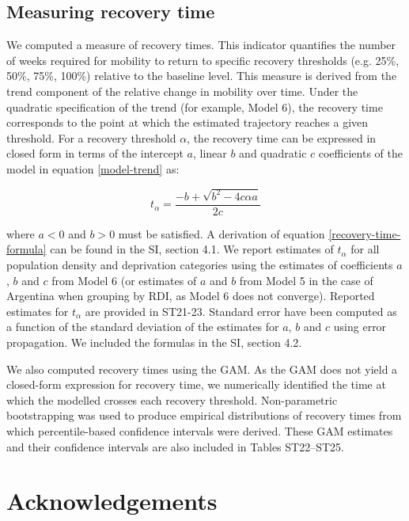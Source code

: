 \documentclass[fleqn,10pt]{wlscirep}
\begin{document}
\subsection*{Measuring recovery time}

We computed a measure of recovery times. This indicator quantifies the number of weeks required for mobility to return to specific recovery thresholds (e.g. 25\%, 50\%, 75\%, 100\%) relative to the baseline level. This measure is derived from the trend component of the relative change in mobility over time. Under the quadratic specification of the trend (for example, Model 6), the recovery time corresponds to the point at which the estimated trajectory reaches a given threshold. For a recovery threshold $\alpha$, the recovery time can be expressed in closed form in terms of the intercept $a$, linear $b$ and quadratic $c$ coefficients of the model in equation \eqref{model-trend} as:

\begin{equation}\label{recovery-time-formula}
    t_{\alpha} = \dfrac{-b + \sqrt{b^2-4c \alpha a}}{2c}
\end{equation}

where $a<0$ and $b>0$ must be satisfied. A derivation of equation \eqref{recovery-time-formula} can be found in the SI, section 4.1. We report estimates of $t_{\alpha}$ for all population density and deprivation categories using the estimates of coefficients $a$, $b$ and $c$ from Model 6 (or estimates of $a$ and $b$ from Model 5 in the case of Argentina when grouping by RDI, as Model 6 does not converge). Reported estimates for $t_{\alpha}$ are provided in ST21-23. Standard error have been computed as a function of the standard deviation of the estimates for $a$, $b$ and $c$ using error propagation. We included the formulas in the SI, section 4.2.

We also computed recovery times using the GAM. As the GAM does not yield a closed-form expression for recovery time, we numerically identified the time at which the modelled crosses each recovery threshold. Non-parametric bootstrapping was used to produce empirical distributions of recovery times from which percentile-based confidence intervals were derived. These GAM estimates and their confidence intervals are also included in Tables ST22–ST25.



\section*{Acknowledgements}
\end{document}
